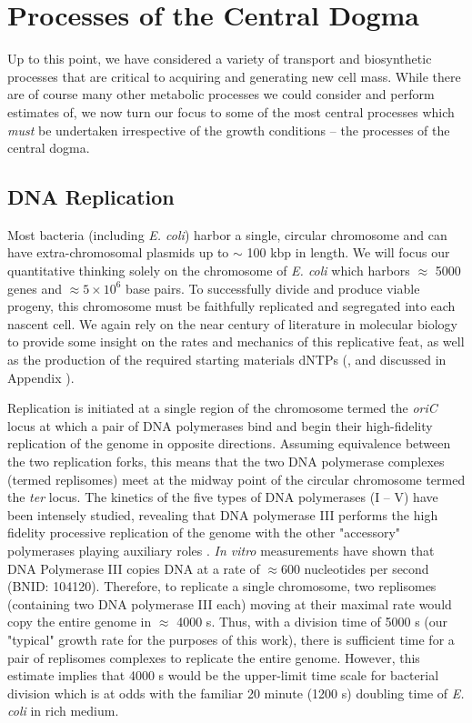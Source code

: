 \section{Processes of the Central Dogma}
Up to this point, we have considered a variety of transport and biosynthetic
processes that are critical to acquiring and generating new cell mass. While
there are of course many other metabolic processes we could consider and
perform estimates of, we now turn our focus to some of the most central processes
which \textit{must} be undertaken irrespective of the growth conditions --
the processes of the central dogma.


\subsection{DNA Replication}
Most bacteria (including \textit{E. coli}) harbor a single, circular chromosome
and can have extra-chromosomal plasmids up to $\sim$ 100 kbp in length. We will focus
our quantitative thinking solely on the chromosome of \textit{E. coli} which
harbors $\approx$ 5000 genes and $\approx 5\times 10^6$ base pairs. To
successfully divide and produce viable progeny, this chromosome must be
faithfully replicated and segregated into each nascent cell. We again rely on
the near century of literature in molecular biology to provide some insight on
the rates and mechanics of this replicative feat, as well as the production of the
required starting materials dNTPs (, and discussed in Appendix ).


Replication is initiated at a single region of the chromosome termed the \textit{oriC} locus at which a pair
of DNA polymerases bind and begin their high-fidelity replication of the genome
in opposite directions. Assuming equivalence between the two replication forks,
this means that the two DNA polymerase complexes (termed replisomes) meet at the
midway point of the circular chromosome termed the \textit{ter} locus. The
kinetics of the five types of DNA polymerases (I -- V) have been intensely
studied, revealing that DNA polymerase III performs the high fidelity processive
replication of the genome with the other "accessory" polymerases playing
auxiliary roles \citep{fijalkowska2012}. \textit{In vitro} measurements have
shown that DNA Polymerase III copies DNA at a rate of $\approx 600$ nucleotides
per second (BNID: 104120). Therefore, to replicate a single
chromosome, two replisomes (containing two DNA polymerase III each) moving at their maximal rate would copy the
entire genome in $\approx$ 4000 s. Thus, with a division time of 5000 s (our
"typical" growth rate for the purposes of this work), there is sufficient time
for a pair of replisomes complexes to replicate the entire genome.
However, this estimate implies that 4000 s would be the upper-limit time scale
for bacterial division which is at odds with the familiar 20 minute (1200 s)
doubling time of \textit{E. coli} in rich medium.

